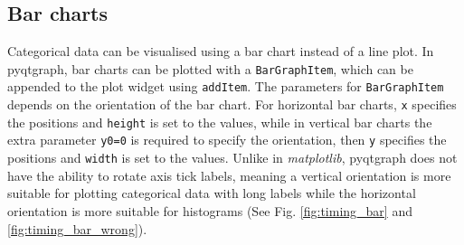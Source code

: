 \documentclass[12pt]{article}
\begin{document}
\subsection{Bar charts}\label{ssec:bar}

Categorical data can be visualised using a bar chart instead of a line plot. In pyqtgraph, bar charts can be plotted with a \texttt{BarGraphItem}, which can be appended to the plot widget using \texttt{addItem}. The parameters for \texttt{BarGraphItem} depends on the orientation of the bar chart. For horizontal bar charts, \texttt{x} specifies the positions and \texttt{height} is set to the values, while in vertical bar charts the extra parameter \texttt{y0=0} is required to specify the orientation, then \texttt{y} specifies the positions and \texttt{width} is set to the values. Unlike in \textit{matplotlib}, pyqtgraph does not have the ability to rotate axis tick labels, meaning a vertical orientation is more suitable for plotting categorical data with long labels while the horizontal orientation is more suitable for histograms (See Fig. \ref{fig:timing_bar} and \ref{fig:timing_bar_wrong}).
\end{document}
